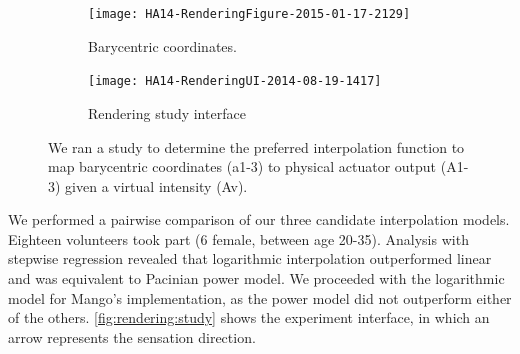 \begin{figure}[t] %
   \centering
  \begin{subfigure}[b]{0.4\textwidth}
  	\centering
	   \texttt{[image: HA14-RenderingFigure-2015-01-17-2129]} 
	   \caption{Barycentric coordinates.}
	   \label{fig:rendering:algorithm:barycentric}
    \end{subfigure}
    \qquad
     \begin{subfigure}[b]{0.4\textwidth}
       	\centering
	   \texttt{[image: HA14-RenderingUI-2014-08-19-1417]} 
	   \caption{Rendering study interface}
	   \label{fig:rendering:study}
    \end{subfigure}

    	   \caption{We ran a study to determine the preferred interpolation function to map barycentric coordinates (a1-3) to physical actuator output (A1-3) given a virtual intensity (Av).}
	   \label{fig:rendering:algorithm}
\end{figure}
%
%
%
%
We performed a pairwise comparison of our three candidate interpolation models.
Eighteen volunteers took part (6 female, between age 20-35). %
%
Analysis with stepwise regression revealed that logarithmic interpolation outperformed linear and was %
equivalent to Pacinian power model. We proceeded with the logarithmic model for Mango's implementation, as the power model did not outperform either of the others. %
\autoref{fig:rendering:study} shows the experiment interface, in which an arrow represents the sensation direction. 


